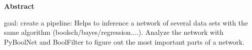 \thispagestyle{empty}


\vspace*{1cm}

\begin{center}
    \textbf{Abstract}
\end{center}

\vspace*{1cm}

\noindent 
goal: create a pipeline: Helps to inference a network of several data sets with the same algorithm (boolsch/bayes/regression....). Analyze the network with PyBoolNet and BoolFilter to figure out the most important parts of a network.